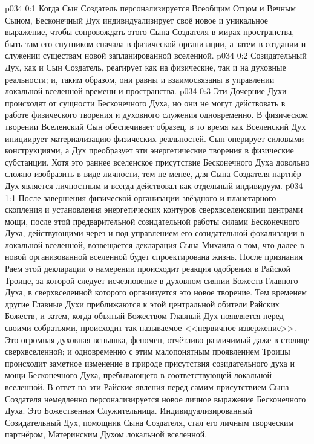 \author{Могущественный Посланник}
\vs p034 0:1 Когда Сын Создатель персонализируется Всеобщим Отцом и Вечным Сыном, Бесконечный Дух индивидуализирует своё новое и уникальное выражение, чтобы сопровождать этого Сына Создателя в мирах пространства, быть там его спутником сначала в физической организации, а затем в создании и служении существам новой запланированной вселенной.
\vs p034 0:2 Созидательный Дух, как и Сын Создатель, реагирует как на физические, так и на духовные реальности; и, таким образом, они равны и взаимосвязаны в управлении локальной вселенной времени и пространства.
\vs p034 0:3 Эти Дочерние Духи происходят от сущности Бесконечного Духа, но они не могут действовать в работе физического творения и духовного служения одновременно. В физическом творении Вселенский Сын обеспечивает образец, в то время как Вселенский Дух инициирует материализацию физических реальностей. Сын оперирует силовыми конструкциями, а Дух преобразует эти энергетические творения в физические субстанции. Хотя это раннее вселенское присутствие Бесконечного Духа довольно сложно изобразить в виде личности, тем не менее, для Сына Создателя партнёр Дух является личностным и всегда действовал как отдельный индивидуум.
\vs p034 1:1 После завершения физической организации звёздного и планетарного скопления и установления энергетических контуров сверхвселенскими центрами мощи, после этой предварительной созидательной работы силами Бесконечного Духа, действующими через и под управлением его созидательной фокализации в локальной вселенной, возвещается декларация Сына Михаила о том, что далее в новой организованной вселенной будет спроектирована жизнь. После признания Раем этой декларации о намерении происходит реакция одобрения в Райской Троице, за которой следует исчезновение в духовном сиянии Божеств Главного Духа, в сверхвселенной которого организуется это новое творение. Тем временем другие Главные Духи приближаются к этой центральной обители  Райских Божеств, и затем, когда объятый Божеством Главный Дух появляется перед своими собратьями, происходит так называемое <<первичное извержение>>. Это огромная духовная вспышка, феномен, отчётливо различимый даже в столице сверхвселенной; и одновременно с этим малопонятным проявлением Троицы происходит заметное изменение в природе присутствия созидательного духа и мощи Бесконечного Духа, пребывающего в соответствующей локальной вселенной. В ответ на эти Райские явления перед самим присутствием Сына Создателя немедленно персонализируется новое личное выражение Бесконечного Духа. Это Божественная Служительница. Индивидуализированный Созидательный Дух, помощник Сына Создателя, стал его личным творческим партнёром, Материнским Духом локальной вселенной.
